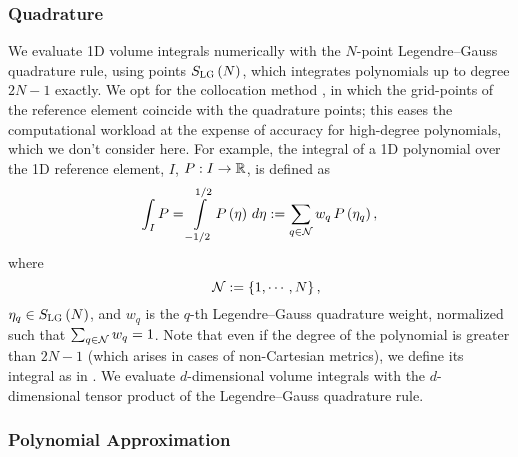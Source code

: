 \subsubsection{Quadrature}

We evaluate 1D volume integrals numerically with the $N$-point
Legendre--Gauss quadrature rule, using points $S_{\textsc{LG}}\left(N\right)$,
which integrates polynomials up to degree $2N-1$ exactly.
We opt for the collocation method \citep{bfg2013},
in which the grid-points of the
reference element coincide with the quadrature points;
this eases the computational workload at the expense of accuracy for
high-degree polynomials, which we don't consider here.
For example, the integral of a 1D polynomial over the 1D reference element, $I$,
$P:I\to\mathbb{R}$, is defined as
\begin{equation}
  \int_{I}P=\int\limits_{-1/2}^{1/2}P\left(\eta\right)\,d\eta
  :=\sum\limits_{q\in\mathcal{N}}w_{q}\,
  P\left(\eta_{q}\right),
  \label{eq.quad}
\end{equation}
where
\begin{equation}
  \hspace{1em}\mathcal{N}:=\left\{1,\cdots,N\right\},
\end{equation}
$\eta_{q}\in S_{\textsc{LG}}\left(N\right)$, and
$w_{q}$ is the $q$-th Legendre--Gauss quadrature weight,
normalized such that $\sum_{q\in\mathcal{N}}w_{q}=1$.
Note that even if the degree of the polynomial is greater than
$2N-1$ (which arises in cases of non-Cartesian metrics),
we define its integral as in .
We evaluate $d$-dimensional volume integrals with the $d$-dimensional
tensor product of the Legendre--Gauss quadrature rule.

\subsubsection{Polynomial Approximation}

